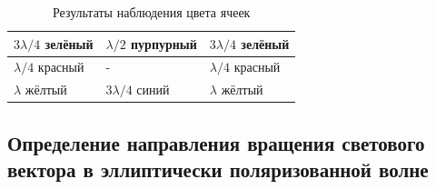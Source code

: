     \begin{table}[h]
    \centering
    \begin{center}
    \caption{Результаты наблюдения цвета ячеек}
    \end{center}
    \vspace{0.1cm}
    \label{tab:my_label}
    \begin{tabular}{ |p{2.5cm}|p{2.5cm}|p{2.5cm}|}
 \hline
 $3\lambda/4$ зелёный & $\lambda/2$ пурпурный & $3\lambda/4$ зелёный\\
\hline
 $\lambda/4$ красный & - & $\lambda/4$ красный \\
\hline
 $\lambda$ жёлтый & $3\lambda/4$ синий & $\lambda$ жёлтый \\
\hline
 
\end{tabular}
\end{table}

\subsection{Определение направления вращения светового вектора в
эллиптически поляризованной волне}

